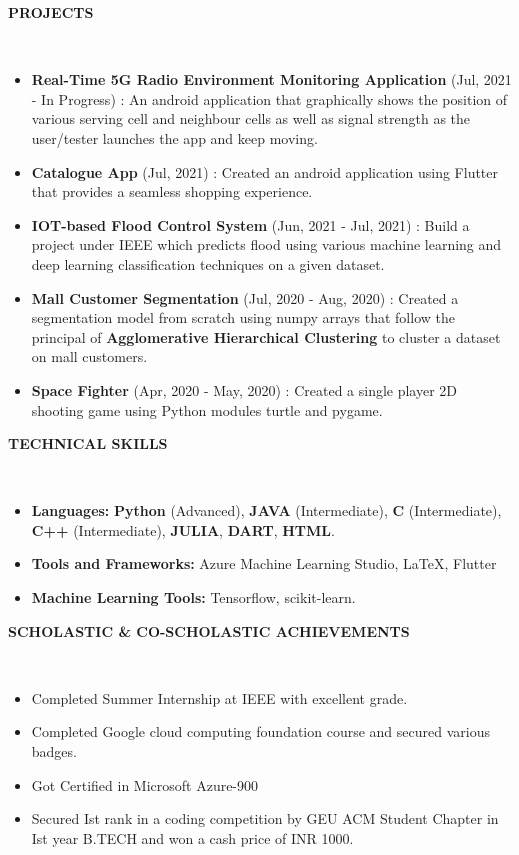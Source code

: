 \documentclass[a4paper,10pt]{article}
\newcommand{\lsep}{-0.5cm}
\newcommand{\resheading}[1]{{\small \colorbox{mygrey}{\begin{minipage}{0.975\textwidth}{\textbf{#1 \vphantom{p\^{E}}}}\end{minipage}}}}
\begin{document}
\resheading{\textbf{PROJECTS} }\\[\lsep]
\begin{itemize}
\setlength\itemsep{0.5em}
\item \textbf{Real-Time 5G Radio Environment Monitoring Application} (Jul, 2021 - In Progress) : An android application that graphically shows the position of various serving cell and neighbour cells as well as signal strength as the user/tester launches the app and keep moving.
\item \textbf{Catalogue App} (Jul, 2021) : Created an android application using Flutter that provides a seamless shopping experience.
\item \textbf{IOT-based Flood Control System} (Jun, 2021 - Jul, 2021) : Build a project under IEEE which predicts flood using various machine learning and deep learning classification techniques on a given dataset.
\item \textbf{Mall Customer Segmentation} (Jul, 2020 - Aug, 2020) : Created a segmentation model from scratch using numpy arrays that follow the principal of \textbf{Agglomerative Hierarchical Clustering} to cluster a dataset on mall customers.
\item \textbf{Space Fighter} (Apr, 2020 - May, 2020) : Created a single player 2D shooting game using Python modules turtle and pygame.
\end{itemize}

\resheading{\textbf{TECHNICAL SKILLS} }\\[\lsep]
\begin{itemize}
\setlength\itemsep{0em}
\item \noindent \textbf{Languages:} \textbf{Python} (Advanced), \textbf{JAVA} (Intermediate), \textbf{C} (Intermediate), \textbf{C++} (Intermediate), \textbf{JULIA}, \textbf{DART}, \textbf{HTML}.\\
 \item \noindent\textbf{Tools and Frameworks:} Azure Machine Learning Studio, \LaTeX, Flutter\\
\item \noindent \textbf{Machine Learning Tools:} Tensorflow, scikit-learn.
\end{itemize}

\resheading{\textbf{SCHOLASTIC \& CO-SCHOLASTIC ACHIEVEMENTS} }\\[\lsep]
\begin{itemize}
\setlength\itemsep{0em}
\item \noindent Completed Summer Internship at IEEE with excellent grade.
\item \noindent Completed Google cloud computing foundation course and secured various badges.
\item \noindent Got Certified in Microsoft Azure-900
\item \noindent Secured Ist rank in a coding competition by GEU ACM Student Chapter in Ist year B.TECH and won a cash price of INR 1000.
\end{itemize}
\end{document}
